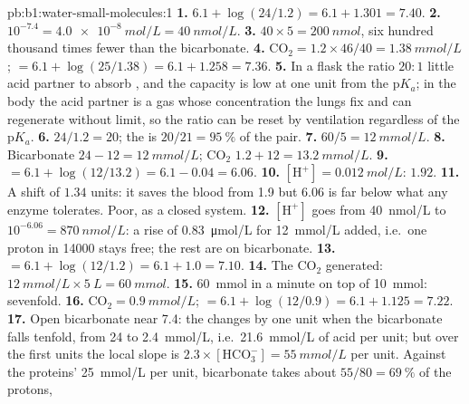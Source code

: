 \begin{solution}{pb:b1:water-small-molecules:1}
\textbf{1.} $6.1 + \log(24/1.2) = 6.1 + 1.301 = 7.40$.
\textbf{2.} $10^{-7.4} = \qty{4.0e-8}{mol/L} = \qty{40}{nmol/L}$.
\textbf{3.} $40\times 5 = \qty{200}{nmol}$, six hundred thousand times
fewer than the bicarbonate.
\textbf{4.} $\mathrm{CO_2} = 1.2\times 46/40 = \qty{1.38}{mmol/L}$;
 $= 6.1 + \log(25/1.38) = 6.1 + 1.258 = 7.36$.
\textbf{5.} In a flask the ratio $20:1$  little acid partner to
absorb , and the capacity is low at one unit from the p$K_a$; in
the body the acid partner is a gas whose concentration the lungs fix
and can regenerate without limit, so the ratio can be reset by
ventilation regardless of the p$K_a$.
\textbf{6.} $24/1.2 = 20$; the  is $20/21 = \qty{95}{\%}$ of the pair.
\textbf{7.} $60/5 = \qty{12}{mmol/L}$.
\textbf{8.} Bicarbonate $24 - 12 = \qty{12}{mmol/L}$; $\mathrm{CO_2}$
$1.2 + 12 = \qty{13.2}{mmol/L}$.
\textbf{9.}  $= 6.1 + \log(12/13.2) = 6.1 - 0.04 = 6.06$.
\textbf{10.} $[\mathrm{H^+}] = \qty{0.012}{mol/L}$:  $1.92$.
\textbf{11.} A shift of $1.34$ units: it saves the blood from  1.9
but 6.06 is far below what any enzyme tolerates. Poor, as a closed
system.
\textbf{12.} $[\mathrm{H^+}]$ goes from \qty{40}{nmol/L} to $10^{-6.06} = \qty{870}{nmol/L}$: a rise of \qty{0.83}{\micro mol/L} for \qty{12}{mmol/L} added, i.e.\ one proton in \num{14000} stays free; the rest are on bicarbonate.
\textbf{13.}  $= 6.1 + \log(12/1.2) = 6.1 + 1.0 = 7.10$.
\textbf{14.} The $\mathrm{CO_2}$ generated: $\qty{12}{mmol/L}\times
\qty{5}{L} = \qty{60}{mmol}$.
\textbf{15.} \qty{60}{mmol} in a minute on top of \qty{10}{mmol}:
sevenfold.
\textbf{16.} $\mathrm{CO_2} = \qty{0.9}{mmol/L}$;  $= 6.1 +
\log(12/0.9) = 6.1 + 1.125 = 7.22$.
\textbf{17.} Open bicarbonate near 7.4: the  changes by one unit
when the bicarbonate falls tenfold, from \qty{24}{} to
\qty{2.4}{mmol/L}, i.e.\ \qty{21.6}{mmol/L} of acid per unit; but over
the first units the local slope is $2.3\times[\mathrm{HCO_3^-}] =
\qty{55}{mmol/L}$ per unit. Against the proteins' \qty{25}{mmol/L} per
unit, bicarbonate takes about $55/80 = \qty{69}{\%}$ of the protons,

\end{solution}
